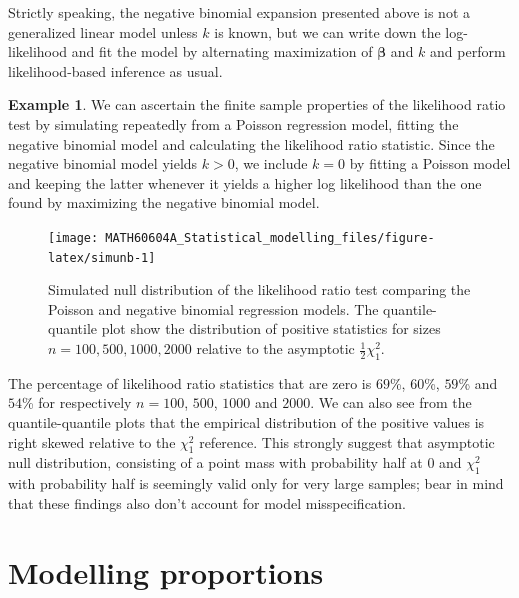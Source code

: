 \documentclass[
  11pt,
  letterpaper,
]{book}
\theoremstyle{definition}
\theoremstyle{definition}
\newtheorem{example}{Example}[chapter]
\theoremstyle{definition}
\theoremstyle{remark}
\begin{document}
Strictly speaking, the negative binomial expansion presented above is not a generalized linear model unless \(k\) is known, but we can write down the log-likelihood and fit the model by alternating maximization of \(\boldsymbol{\beta}\) and \(k\) and perform likelihood-based inference as usual.

\begin{example}
\protect\hypertarget{exm:unnamed-chunk-2}{}{\label{exm:unnamed-chunk-2} }We can ascertain the finite sample properties of the likelihood ratio test by simulating repeatedly from a Poisson regression model, fitting the negative binomial model and calculating the likelihood ratio statistic. Since the negative binomial model yields \(k>0\), we include \(k=0\) by fitting a Poisson model and keeping the latter whenever it yields a higher log likelihood than the one found by maximizing the negative binomial model.
\end{example}

\begin{figure}

{\centering \texttt{[image: MATH60604A\_Statistical\_modelling\_files/figure-latex/simunb-1]} 

}

\caption{Simulated null distribution of the likelihood ratio test comparing the Poisson and negative binomial regression models. The quantile-quantile plot show the distribution of positive statistics for sizes $n=100, 500, 1000, 2000$ relative to the asymptotic $\frac{1}{2}\chi^2_1$.}\label{fig:simunb}
\end{figure}

The percentage of likelihood ratio statistics that are zero is \(69\)\%, \(60\)\%, \(59\)\% and \(54\)\% for respectively \(n=100\), \(500\), \(1000\) and \(2000\). We can also see from the quantile-quantile plots that the empirical distribution of the positive values is right skewed relative to the \(\chi^2_1\) reference. This strongly suggest that asymptotic null distribution, consisting of a point mass with probability half at \(0\) and \(\chi^2_1\) with probability half is seemingly valid only for very large samples; bear in mind that these findings also don't account for model misspecification.

\hypertarget{modelling-proportions}{%
\section{Modelling proportions}\label{modelling-proportions}}
\end{document}
